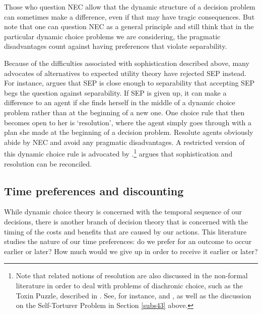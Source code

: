 Those who question NEC allow that the dynamic structure of a decision problem can sometimes make a difference, even if that may have tragic consequences. But note that one can question NEC as a general principle and still think that in the particular dynamic choice problems we are considering, the pragmatic disadvantages count against having preferences that violate separability.

Because of the difficulties associated with sophistication described above, many advocates of alternatives to expected utility theory have rejected SEP instead. For instance, \citet{Machina1989} argues that SEP is close enough to separability that accepting SEP begs the question against separability. If SEP is given up, it can make a difference to an agent if she finds herself in the middle of a dynamic choice problem rather than at the beginning of a new one. One choice rule that then becomes open to her is `resolution', where the agent simply goes through with a plan she made at the beginning of a decision problem. Resolute agents obviously abide by NEC and avoid any pragmatic disadvantages. A restricted version of this dynamic choice rule is advocated by \citet{McClennen1990}.\footnote{Note that related notions of resolution are also discussed in the non-formal literature in order to deal with problems of diachronic choice, such as the Toxin Puzzle, described in \citet{Kavka1983}. See, for instance, \citet{Holton2009} and \citet{Bratman1998}, as well as the discussion on the Self-Torturer Problem in Section \ref{subs43} above.} \citet{Rabinowicz1995} argues that sophistication and resolution can be reconciled.

\subsection{Time preferences and discounting}\label{subs72}

While dynamic choice theory is concerned with the temporal sequence of our decisions, there is another branch of decision theory that is concerned with the timing of the costs and benefits that are caused by our actions. This literature studies the nature of our time preferences: do we prefer for an outcome to occur earlier or later? How much would we give up in order to receive it earlier or later?

